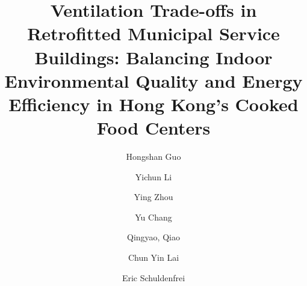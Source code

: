 \documentclass[preprint,12pt]{elsarticle}
\begin{document}
\begin{frontmatter}





\title{Ventilation Trade-offs in Retrofitted Municipal Service Buildings: Balancing Indoor Environmental Quality and Energy Efficiency in Hong Kong’s Cooked Food Centers}





\author[inst1]{Hongshan Guo}
\author[inst1]{Yichun Li}
\author[inst1]{Ying Zhou}
\author[inst1]{Yu Chang}
\author[inst1]{Qingyao, Qiao}
\author[inst2]{Chun Yin Lai}
\author[inst1]{Eric Schuldenfrei}


\end{frontmatter}
\end{document}
